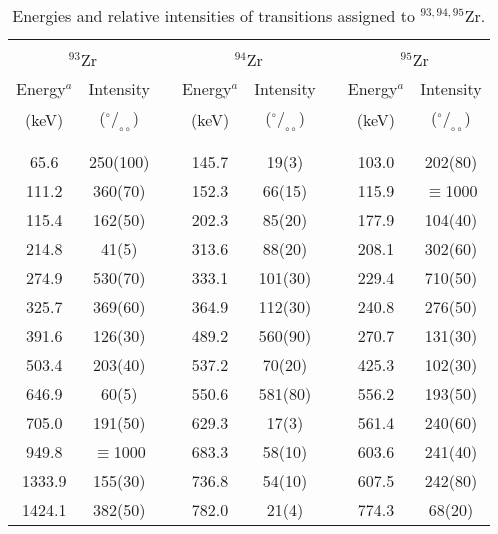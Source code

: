 \begin{table}
\caption[]{ Energies and relative intensities of transitions assigned to $^{93,94,95}$Zr.}
\begin{tabular}{cccccccc}
\hspace{1.2cm} & \hspace{1.2cm} & \hspace{0.5cm} & \hspace{1.2cm} & \hspace{1.2cm}
 & \hspace{0.5cm} & \hspace{1.2cm}  & \hspace{1.2cm} \\
\multicolumn{2}{c}{$^{93}$Zr} & & \multicolumn{2}{c}{$^{94}$Zr} &&
\multicolumn{2}{c}{$^{95}$Zr} \\
Energy$^{a}$  &  Intensity &  & Energy$^{a}$  &  Intensity &  &
Energy$^{a}$  &  Intensity \\
 (keV) & ($^{\circ}/_{\circ\circ}$) & & (keV) & ($^{\circ}/_{\circ\circ}$) & &
 (keV) & ($^{\circ}/_{\circ\circ}$) \\
 & & & & & & & \\  \hline
 & & & & & & &  \\
  65.6 & 250(100)& & 145.7 &  19(3)  & & 103.0 & 202(80)  \\ [0.2cm]
 111.2 & 360(70) & & 152.3 &  66(15) & & 115.9 & $\equiv$1000 \\ [0.2cm]
 115.4 & 162(50) & & 202.3 &  85(20) & & 177.9 & 104(40)  \\ [0.2cm]
 214.8 &  41(5)  & & 313.6 &  88(20) & & 208.1 & 302(60)  \\ [0.2cm]
 274.9 & 530(70) & & 333.1 & 101(30) & & 229.4 & 710(50)  \\ [0.2cm]
 325.7 & 369(60) & & 364.9 & 112(30) & & 240.8 & 276(50)  \\ [0.2cm]
 391.6 & 126(30) & & 489.2 & 560(90) & & 270.7 & 131(30)  \\ [0.2cm]
 503.4 & 203(40) & & 537.2 &  70(20) & & 425.3 & 102(30)  \\ [0.2cm]
 646.9 &  60(5)  & & 550.6 & 581(80) & & 556.2 & 193(50)  \\ [0.2cm]
 705.0 & 191(50) & & 629.3 &  17(3)  & & 561.4 & 240(60)  \\ [0.2cm]
 949.8 & $\equiv$1000 & & 683.3 & 58(10) & & 603.6 & 241(40) \\ [0.2cm]
1333.9 & 155(30) & & 736.8 &  54(10) & & 607.5 & 242(80)  \\ [0.2cm]
1424.1 & 382(50) & & 782.0 &  21(4)  & & 774.3 &  68(20)  \\ [0.2cm]

\end{tabular}
\end{table}

